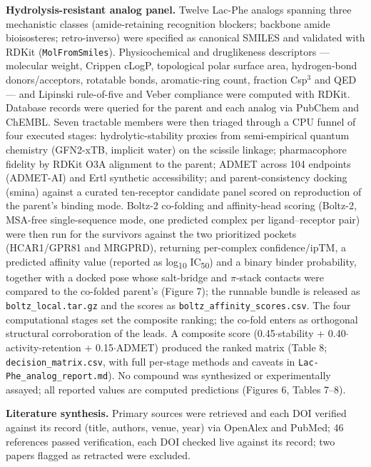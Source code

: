 \documentclass[11pt]{article}
\begin{document}
\textbf{Hydrolysis-resistant analog panel.} Twelve Lac-Phe analogs spanning three
mechanistic classes (amide-retaining recognition blockers; backbone amide bioisosteres;
retro-inverso) were specified as canonical SMILES and validated with RDKit
(\texttt{MolFromSmiles}). Physicochemical and druglikeness descriptors --- molecular weight,
Crippen cLogP, topological polar surface area, hydrogen-bond donors/acceptors, rotatable
bonds, aromatic-ring count, fraction Csp$^3$ and QED --- and Lipinski rule-of-five and Veber
compliance were computed with RDKit. Database records were queried for the parent and each
analog via PubChem and ChEMBL. Seven tractable members were then triaged through a
CPU funnel of four executed stages: hydrolytic-stability proxies from semi-empirical quantum
chemistry (GFN2-xTB, implicit water) on the scissile linkage; pharmacophore fidelity by RDKit
O3A alignment to the parent; ADMET across 104 endpoints (ADMET-AI) and Ertl synthetic
accessibility; and parent-consistency docking (smina) against a curated ten-receptor candidate
panel scored on reproduction of the parent's binding mode. Boltz-2 co-folding and affinity-head
scoring (Boltz-2, MSA-free single-sequence mode, one predicted complex per ligand--receptor pair)
were then run for the survivors against the two prioritized pockets (HCAR1/GPR81 and MRGPRD),
returning per-complex confidence/ipTM, a predicted affinity value (reported as log\textsubscript{10}
IC\textsubscript{50}) and a binary binder probability, together with a docked pose whose
salt-bridge and $\pi$-stack contacts were compared to the co-folded parent's (Figure 7); the
runnable bundle is released as \texttt{boltz\_local.tar.gz} and the scores as
\texttt{boltz\_affinity\_scores.csv}. The four
computational stages set the composite ranking; the co-fold enters as orthogonal structural
corroboration of the leads. A composite score
(0.45$\cdot$stability + 0.40$\cdot$activity-retention + 0.15$\cdot$ADMET) produced the ranked
matrix (Table 8; \texttt{decision\_matrix.csv}, with full per-stage methods and caveats in
\texttt{Lac-Phe\_analog\_report.md}). No compound was synthesized or experimentally assayed;
all reported values are computed predictions (Figures 6, Tables 7--8).

\textbf{Literature synthesis.} Primary sources were retrieved and each DOI verified against
its record (title, authors, venue, year) via OpenAlex and PubMed; 46 references passed verification, each DOI checked live against its record; two papers flagged as retracted were excluded.
\end{document}

